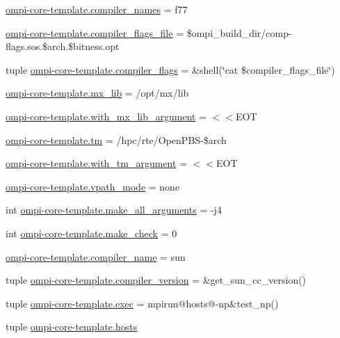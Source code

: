 \begin{DoxyCompactItemize}
\item 
\hyperlink{namespaceompi-core-template_ad9ac09e41f4ccb6262103f180cbfc0db}{ompi-\/core-\/template.\-compiler\-\_\-names} = f77
\item 
\hyperlink{namespaceompi-core-template_aa07e281cdd8bbbdaa204857ffbffea46}{ompi-\/core-\/template.\-compiler\-\_\-flags\-\_\-file} = \$ompi\-\_\-build\-\_\-dir/comp-\/flags.\-sos.\$arch.\$bitness.\-opt
\item 
tuple \hyperlink{namespaceompi-core-template_a5b2489e93c91084486e1d16ae13723b8}{ompi-\/core-\/template.\-compiler\-\_\-flags} = \&shell(\char`\"{}cat \$compiler\-\_\-flags\-\_\-file\char`\"{})
\item 
\hyperlink{namespaceompi-core-template_ad39b6930be020ebedb6e85a5fa1d6602}{ompi-\/core-\/template.\-mx\-\_\-lib} = /opt/mx/lib
\item 
\hyperlink{namespaceompi-core-template_a961a3e9f58483894d366809baf236a0f}{ompi-\/core-\/template.\-with\-\_\-mx\-\_\-lib\-\_\-argument} = $<$$<$E\-O\-T
\item 
\hyperlink{namespaceompi-core-template_a33bc188e781bcf5335e314bb324499c4}{ompi-\/core-\/template.\-tm} = /hpc/rte/Open\-P\-B\-S-\/\$arch
\item 
\hyperlink{namespaceompi-core-template_a99715f0b797884f5eb56ad57c31d3498}{ompi-\/core-\/template.\-with\-\_\-tm\-\_\-argument} = $<$$<$E\-O\-T
\item 
\hyperlink{namespaceompi-core-template_a9cc0911af42525eed84ffc2ecf620987}{ompi-\/core-\/template.\-vpath\-\_\-mode} = none
\item 
int \hyperlink{namespaceompi-core-template_a7e4e240833589ea0dd76624fe36aa7ed}{ompi-\/core-\/template.\-make\-\_\-all\-\_\-arguments} = -\/j4
\item 
int \hyperlink{namespaceompi-core-template_af74a20b172057ad9db8c98040d6695ab}{ompi-\/core-\/template.\-make\-\_\-check} = 0
\item 
\hyperlink{namespaceompi-core-template_a5b83ee824af44e042ab01020557d1718}{ompi-\/core-\/template.\-compiler\-\_\-name} = sun
\item 
tuple \hyperlink{namespaceompi-core-template_a7cee2f24a23de4deacdb5e9b2ac629de}{ompi-\/core-\/template.\-compiler\-\_\-version} = \&get\-\_\-sun\-\_\-cc\-\_\-version()
\item 
tuple \hyperlink{namespaceompi-core-template_a053976d8fb6135592c6990fd3f75537a}{ompi-\/core-\/template.\-exec} = mpirun@hosts@-\/np\&test\-\_\-np()
\item 
tuple \hyperlink{namespaceompi-core-template_a07fe97780730a6b76bec87d365cc8bd6}{ompi-\/core-\/template.\-hosts}

\end{DoxyCompactItemize}

